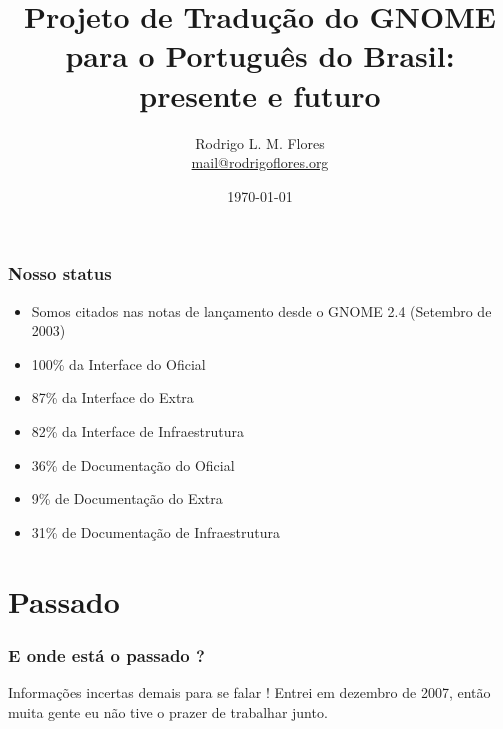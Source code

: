 \documentclass{beamer}
\title{Projeto de Tradução do GNOME para o Português do Brasil: presente e futuro}
\author{Rodrigo L. M. Flores \\ \url{mail@rodrigoflores.org}}
\institute{GNOME Brasil}
\begin{document}
\date{\today}

\frame{\titlepage}

\frame{\tableofcontents}

\begin{frame}
    \frametitle{Nosso status}    
    \begin{itemize}[<+->]
        \item \color[rgb]{0,1,0} Somos citados nas notas de lançamento desde o GNOME 2.4 (Setembro de 2003)  
        \item \color[rgb]{0,1,0} 100\% da Interface do Oficial 
        \item \color[rgb]{0,1,0} 87\% da Interface do Extra
        \item \color[rgb]{0,1,0} 82\% da Interface de Infraestrutura
        \item \color[rgb]{1,0,0} 36\% de Documentação do Oficial
        \item \color[rgb]{1,0,0} 9\%  de Documentação do Extra
        \item \color[rgb]{1,0,0} 31\% de Documentação de Infraestrutura
    \end{itemize}
\end{frame}

\section{Passado}

\begin{frame}
    \frametitle{E onde está o passado ?}
    Informações incertas demais para se falar ! Entrei em dezembro de 2007, então muita gente eu não tive
    o prazer de trabalhar junto. 
\end{frame}
\end{document}

